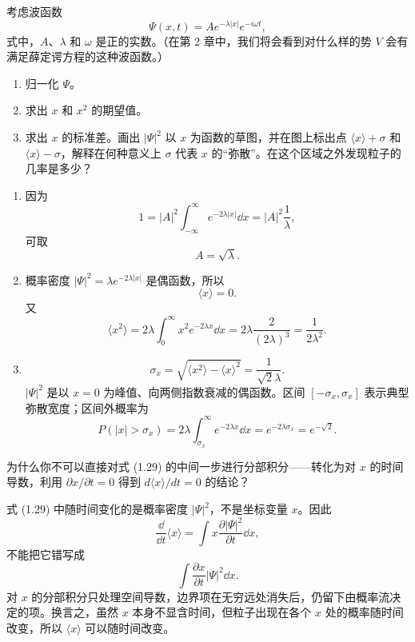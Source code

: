 \begin{question}
考虑波函数
\[
\Psi(x,t)=A e^{-\lambda |x|} e^{-i\omega t},
\]
式中，$A$、$\lambda$ 和 $\omega$ 是正的实数。（在第 2 章中，我们将会看到对什么样的势 $V$ 会有满足薛定谔方程的这种波函数。）
\begin{enumerate}
\item 归一化 $\Psi$。
\item 求出 $x$ 和 $x^2$ 的期望值。
\item 求出 $x$ 的标准差。画出 $|\Psi|^2$ 以 $x$ 为函数的草图，并在图上标出点 $\langle x\rangle+\sigma$ 和 $\langle x\rangle-\sigma$，解释在何种意义上 $\sigma$ 代表 $x$ 的“弥散”。在这个区域之外发现粒子的几率是多少？
\end{enumerate}
\end{question}
\begin{solution}
\begin{enumerate}
\item 因为
\[
1=|A|^2\int_{-\infty}^{\infty}e^{-2\lambda |x|}\dd x
=|A|^2\frac{1}{\lambda},
\]
可取
\[
A=\sqrt{\lambda}.
\]
\item 概率密度 $|\Psi|^2=\lambda e^{-2\lambda |x|}$ 是偶函数，所以
\[
\langle x\rangle=0.
\]
又
\[
\langle x^2\rangle=2\lambda\int_0^\infty x^2e^{-2\lambda x}\dd x
=2\lambda\frac{2}{(2\lambda)^3}=\frac{1}{2\lambda^2}.
\]
\item
\[
\sigma_x=\sqrt{\langle x^2\rangle-\langle x\rangle^2}=\frac{1}{\sqrt2\lambda}.
\]
$|\Psi|^2$ 是以 $x=0$ 为峰值、向两侧指数衰减的偶函数。区间
$[-\sigma_x,\sigma_x]$ 表示典型弥散宽度；区间外概率为
\[
P(|x|>\sigma_x)=2\lambda\int_{\sigma_x}^{\infty}e^{-2\lambda x}\dd x
=e^{-2\lambda\sigma_x}=e^{-\sqrt2}.
\]
\end{enumerate}
\end{solution}

\begin{question}
为什么你不可以直接对式 (1.29) 的中间一步进行分部积分——转化为对 $x$ 的时间导数，利用 $\partial x/\partial t=0$ 得到 $d\langle x\rangle/dt=0$ 的结论？

\par\smallskip
{}

\end{question}
\begin{solution}
式 (1.29) 中随时间变化的是概率密度 $|\Psi|^2$，不是坐标变量 $x$。因此
\[
\frac{\dd}{\dd t}\langle x\rangle
=\int x\frac{\partial |\Psi|^2}{\partial t}\dd x,
\]
不能把它错写成
\[
\int \frac{\partial x}{\partial t}|\Psi|^2\dd x.
\]
对 $x$ 的分部积分只处理空间导数，边界项在无穷远处消失后，仍留下由概率流决定的项。换言之，虽然 $x$ 本身不显含时间，但粒子出现在各个 $x$ 处的概率随时间改变，所以 $\langle x\rangle$ 可以随时间改变。
\end{solution}


